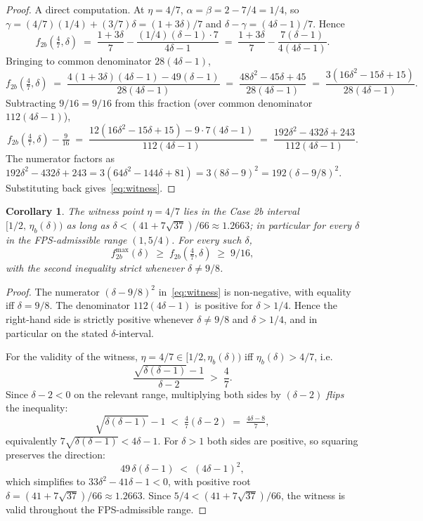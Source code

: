 \documentclass[11pt,a4paper]{article}
\newtheorem{corollary}[theorem]{Corollary}
\theoremstyle{definition}
\begin{document}
\begin{proof}
A direct computation. At $\eta = 4/7$, $\alpha = \beta =
2 - 7/4 = 1/4$, so $\gamma = (4/7)(1/4) + (3/7)\delta =
(1 + 3\delta)/7$ and $\delta - \gamma = (4\delta - 1)/7$. Hence
\[
   f_{2b}\!\left(\tfrac{4}{7}, \delta\right)
   \;=\; \frac{1 + 3\delta}{7}
       - \frac{(1/4)(\delta - 1) \cdot 7}{4\delta - 1}
   \;=\; \frac{1 + 3\delta}{7}
       - \frac{7(\delta - 1)}{4(4\delta - 1)}.
\]
Bringing to common denominator $28(4\delta - 1)$,
\[
   f_{2b}\!\left(\tfrac{4}{7}, \delta\right)
   \;=\; \frac{4(1 + 3\delta)(4\delta - 1) - 49(\delta - 1)}
              {28(4\delta - 1)}
   \;=\; \frac{48\delta^2 - 45\delta + 45}{28(4\delta - 1)}
   \;=\; \frac{3(16\delta^2 - 15\delta + 15)}{28(4\delta - 1)}.
\]
Subtracting $9/16 = 9/16$ from this fraction
(over common denominator $112(4\delta - 1)$),
\[
   f_{2b}\!\left(\tfrac{4}{7}, \delta\right) - \tfrac{9}{16}
   \;=\; \frac{12(16\delta^2 - 15\delta + 15) - 9 \cdot 7 (4\delta - 1)}
              {112(4\delta - 1)}
   \;=\; \frac{192\delta^2 - 432\delta + 243}{112(4\delta - 1)}.
\]
The numerator factors as
$192\delta^2 - 432\delta + 243 = 3(64\delta^2 - 144\delta + 81)
= 3(8\delta - 9)^2 = 192(\delta - 9/8)^2$.
Substituting back gives~\eqref{eq:witness}.
\end{proof}

\begin{corollary}\label{cor:witness}
The witness point $\eta = 4/7$ lies in the Case 2b interval
$[1/2,\,\eta_b(\delta))$ as long as $\delta < (41 + 7\sqrt{37})/66
\approx 1.2663$; in particular for every $\delta$ in the
FPS-admissible range $(1, 5/4)$. For every such $\delta$,
\[
   f_{2b}^{\max}(\delta) \;\ge\; f_{2b}\!\left(\tfrac{4}{7}, \delta\right)
                          \;\ge\; 9/16,
\]
with the second inequality strict whenever $\delta \neq 9/8$.
\end{corollary}

\begin{proof}
The numerator $(\delta - 9/8)^2$ in~\eqref{eq:witness} is
non-negative, with equality iff $\delta = 9/8$. The denominator
$112(4\delta - 1)$ is positive for $\delta > 1/4$. Hence the
right-hand side is strictly positive whenever $\delta \neq 9/8$ and
$\delta > 1/4$, and in particular on the stated $\delta$-interval.

For the validity of the witness, $\eta = 4/7 \in [1/2, \eta_b(\delta))$
iff $\eta_b(\delta) > 4/7$, i.e.\
\[
   \frac{\sqrt{\delta(\delta - 1)} - 1}{\delta - 2} \;>\; \frac{4}{7}.
\]
Since $\delta - 2 < 0$ on the relevant range, multiplying both sides
by $(\delta - 2)$ \emph{flips} the inequality:
\[
   \sqrt{\delta(\delta - 1)} - 1 \;<\; \tfrac{4}{7}(\delta - 2)
   \;=\; \tfrac{4\delta - 8}{7},
\]
equivalently $7\sqrt{\delta(\delta - 1)} < 4\delta - 1$. For
$\delta > 1$ both sides are positive, so squaring preserves the
direction:
\[
   49\,\delta(\delta - 1) \;<\; (4\delta - 1)^2,
\]
which simplifies to $33\delta^2 - 41\delta - 1 < 0$, with positive
root $\delta = (41 + 7\sqrt{37})/66 \approx 1.2663$. Since
$5/4 < (41 + 7\sqrt{37})/66$, the witness is valid throughout the
FPS-admissible range.
\end{proof}
\end{document}
